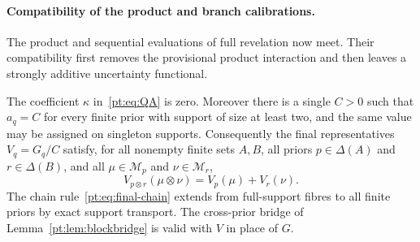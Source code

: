 \paragraph{Compatibility of the product and branch calibrations.}

The product and sequential evaluations of full revelation now meet.  Their
compatibility first removes the provisional product interaction and then
leaves a strongly additive uncertainty functional.

\begin{lemma}
\label{pt:lem:scalecoherence}
The coefficient $\kappa$ in~\eqref{pt:eq:QA} is zero.  Moreover there is a
single $C>0$ such that $a_q=C$ for every finite prior with support of size at
least two, and the same value may be assigned on singleton supports.
Consequently the final representatives $V_q=G_q/C$ satisfy, for all nonempty
finite sets $A,B$, all priors $p\in\Delta(A)$ and $r\in\Delta(B)$, and all
$\mu\in\mathcal M_p$ and $\nu\in\mathcal M_r$,
\begin{equation}
 V_{p\otimes r}(\mu\otimes\nu)
   =V_p(\mu)+V_r(\nu).
\tag{PA}\label{pt:eq:PArecovered}
\end{equation}
The chain rule~\eqref{pt:eq:final-chain} extends from full-support fibres to
all finite priors by exact support transport.
The cross-prior bridge of Lemma~\ref{pt:lem:blockbridge} is valid with $V$
in place of $G$.
\end{lemma}

